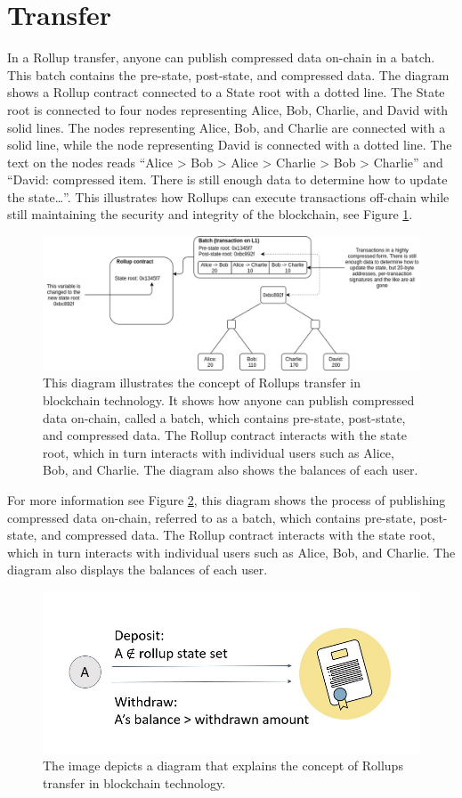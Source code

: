 \section{Transfer}
In a Rollup transfer, anyone can publish compressed data on-chain in a batch. This batch contains the pre-state, post-state, and compressed data. The diagram shows a Rollup contract connected to a State root with a dotted line. The State root is connected to four nodes representing Alice, Bob, Charlie, and David with solid lines. The nodes representing Alice, Bob, and Charlie are connected with a solid line, while the node representing David is connected with a dotted line. The text on the nodes reads “Alice > Bob > Alice > Charlie > Bob > Charlie” and “David: compressed item. There is still enough data to determine how to update the state…”. This illustrates how Rollups can execute transactions off-chain while still maintaining the security and integrity of the blockchain, see Figure \ref{fig:L14_f2}.
\begin{center}
	\begin{figure}
		\centering
		\includegraphics[width=0.8\linewidth]{Fig/14/F2}
		\caption{This diagram illustrates the concept of Rollups transfer in blockchain technology. It shows how anyone can publish compressed data on-chain, called a batch, which contains pre-state, post-state, and compressed data. The Rollup contract interacts with the state root, which in turn interacts with individual users such as Alice, Bob, and Charlie. The diagram also shows the balances of each user.
		}
		\label{fig:L14_f2}
	\end{figure}
\end{center}
For more information see Figure \ref{fig:L14_f3}, this diagram shows the process of publishing compressed data on-chain, referred to as a batch, which contains pre-state, post-state, and compressed data. The Rollup contract interacts with the state root, which in turn interacts with individual users such as Alice, Bob, and Charlie. The diagram also displays the balances of each user.
\begin{center}
	\begin{figure}
		\centering
		\includegraphics[width=0.8\linewidth]{Fig/14/F3}
		\caption{The image depicts a diagram that explains the concept of Rollups transfer in blockchain technology.
		}
		\label{fig:L14_f3}
	\end{figure}
\end{center}
